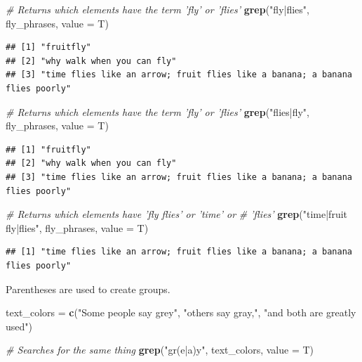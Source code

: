 \documentclass[
]{book}
\newenvironment{Shaded}{\begin{snugshade}}{\end{snugshade}}
\newcommand{\CommentTok}[1]{\textcolor[rgb]{0.56,0.35,0.01}{\textit{#1}}}
\newcommand{\DataTypeTok}[1]{\textcolor[rgb]{0.13,0.29,0.53}{#1}}
\newcommand{\KeywordTok}[1]{\textcolor[rgb]{0.13,0.29,0.53}{\textbf{#1}}}
\newcommand{\NormalTok}[1]{#1}
\newcommand{\StringTok}[1]{\textcolor[rgb]{0.31,0.60,0.02}{#1}}
\begin{document}
\begin{Shaded}
\begin{Highlighting}[]
\CommentTok{# Returns which elements have the term 'fly' or 'flies'}
\KeywordTok{grep}\NormalTok{(}\StringTok{"fly|flies"}\NormalTok{, fly_phrases, }\DataTypeTok{value =}\NormalTok{ T)}
\end{Highlighting}
\end{Shaded}

\begin{verbatim}
## [1] "fruitfly"                                                                  
## [2] "why walk when you can fly"                                                 
## [3] "time flies like an arrow; fruit flies like a banana; a banana flies poorly"
\end{verbatim}

\begin{Shaded}
\begin{Highlighting}[]
\CommentTok{# Returns which elements have the term 'fly' or 'flies'}
\KeywordTok{grep}\NormalTok{(}\StringTok{"flies|fly"}\NormalTok{, fly_phrases, }\DataTypeTok{value =}\NormalTok{ T)}
\end{Highlighting}
\end{Shaded}

\begin{verbatim}
## [1] "fruitfly"                                                                  
## [2] "why walk when you can fly"                                                 
## [3] "time flies like an arrow; fruit flies like a banana; a banana flies poorly"
\end{verbatim}

\begin{Shaded}
\begin{Highlighting}[]
\CommentTok{# Returns which elements have 'fly flies' or 'time' or}
\CommentTok{# 'flies'}
\KeywordTok{grep}\NormalTok{(}\StringTok{"time|fruit fly|flies"}\NormalTok{, fly_phrases, }\DataTypeTok{value =}\NormalTok{ T)}
\end{Highlighting}
\end{Shaded}

\begin{verbatim}
## [1] "time flies like an arrow; fruit flies like a banana; a banana flies poorly"
\end{verbatim}

Parentheses are used to create groups.

\begin{Shaded}
\begin{Highlighting}[]
\NormalTok{text_colors =}\StringTok{ }\KeywordTok{c}\NormalTok{(}\StringTok{"Some people say grey"}\NormalTok{, }\StringTok{"others say gray,"}\NormalTok{, }\StringTok{"and both are greatly used"}\NormalTok{)}

\CommentTok{# Searches for the same thing}
\KeywordTok{grep}\NormalTok{(}\StringTok{"gr(e|a)y"}\NormalTok{, text_colors, }\DataTypeTok{value =}\NormalTok{ T)}
\end{Highlighting}
\end{Shaded}
\end{document}
